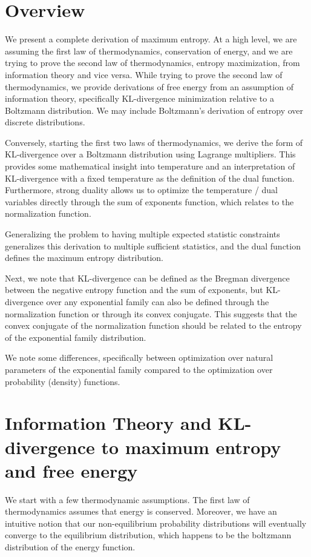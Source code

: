 \documentclass[a4paper]{article}
\begin{document}
\section{Overview}
We present a complete derivation of maximum entropy.  At a high level, we are assuming the first law of thermodynamics, conservation of energy, and we are trying to prove the second law of thermodynamics, entropy maximization, from information theory and vice versa.  
While trying to prove the second law of thermodynamics, we provide derivations of free energy from an assumption of information theory, specifically KL-divergence minimization relative to a Boltzmann distribution.  
We may include Boltzmann's derivation of entropy over discrete distributions. 

Conversely, starting the first two laws of thermodynamics, we derive the form of KL-divergence over a Boltzmann distribution using Lagrange multipliers. 
This provides some mathematical insight into temperature and an interpretation of KL-divergence with a fixed temperature as the definition of the dual function. 
Furthermore, strong duality allows us to optimize the temperature / dual variables directly through the sum of exponents function, which relates to the normalization function. 

Generalizing the problem to having multiple expected statistic constraints generalizes this derivation to multiple sufficient statistics, and the dual function defines the maximum entropy distribution.

Next, we note that KL-divergence can be defined as the Bregman divergence between the negative entropy function and the sum of exponents, but KL-divergence over any exponential family can also be defined through the normalization function or through its convex conjugate.  
This suggests that the convex conjugate of the normalization function should be related to the entropy of the exponential family distribution.

We note some differences, specifically between optimization over natural parameters of the exponential family compared to the optimization over probability (density) functions.

\section{Information Theory and KL-divergence to maximum entropy and free energy}

We start with a few thermodynamic assumptions.  The first law of thermodynamics assumes that energy is conserved.  Moreover, we have an intuitive notion that our non-equilibrium probability distributions will eventually converge to the equilibrium distribution, which happens to be the boltzmann distribution of the energy function.
\end{document}
